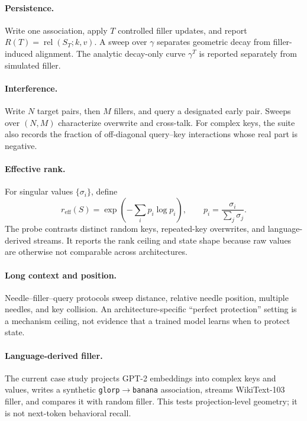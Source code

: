 \documentclass[10pt,twocolumn]{article}
\begin{document}
\paragraph{Persistence.}
Write one association, apply $T$ controlled filler updates, and report
$R(T)=\operatorname{rel}(S_T;k,v)$.  A sweep over $\gamma$ separates geometric
decay from filler-induced alignment.  The analytic decay-only curve
$\gamma^T$ is reported separately from simulated filler.

\paragraph{Interference.}
Write $N$ target pairs, then $M$ fillers, and query a designated early pair.
Sweeps over $(N,M)$ characterize overwrite and cross-talk.  For complex keys,
the suite also records the fraction of off-diagonal query--key interactions
whose real part is negative.

\paragraph{Effective rank.}
For singular values $\{\sigma_i\}$, define
\begin{equation}
  r_{\mathrm{eff}}(S)=
  \exp\left(-\sum_i p_i\log p_i\right),\qquad
  p_i=\frac{\sigma_i}{\sum_j\sigma_j}.
  \label{eq:erank}
\end{equation}
The probe contrasts distinct random keys, repeated-key overwrites, and
language-derived streams.  It reports the rank ceiling and state shape because
raw values are otherwise not comparable across architectures.

\paragraph{Long context and position.}
Needle--filler--query protocols sweep distance, relative needle position,
multiple needles, and key collision.  An architecture-specific ``perfect
protection'' setting is a mechanism ceiling, not evidence that a trained model
learns when to protect state.

\paragraph{Language-derived filler.}
The current case study projects GPT-2 embeddings into complex keys and values,
writes a synthetic \texttt{glorp}$\rightarrow$\texttt{banana} association,
streams WikiText-103 filler, and compares it with random filler.  This tests
projection-level geometry; it is not next-token behavioral recall.
\end{document}
